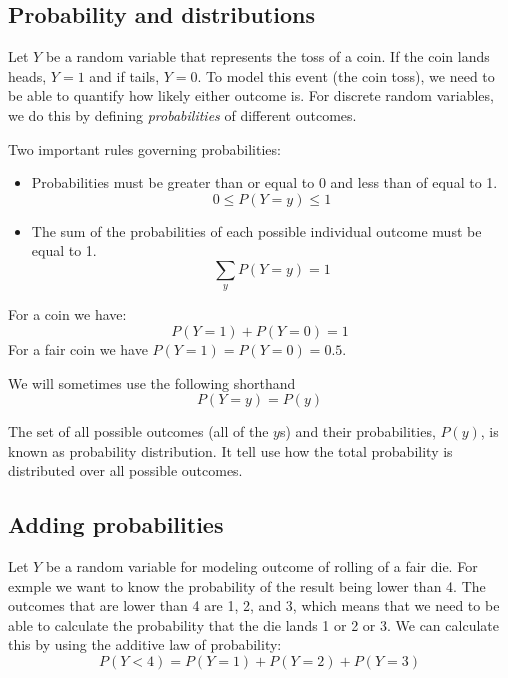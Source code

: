 \documentclass[a4paper,11pt]{article} %
\begin{document}
\subsection{Probability and distributions}

Let $Y$ be a random variable that represents the toss of a coin. If the coin lands heads,
$Y=1$ and if tails, $Y = 0$. To model this event (the coin toss), we need to be able
to quantify how likely either outcome is. For discrete random variables, we do this
by defining \emph{probabilities} of different outcomes.

Two important rules governing probabilities:
\begin{itemize}
%
\item Probabilities must be greater than or equal to 0 and less than of equal to 1.
\begin{equation}
0 \leq P(Y=y) \leq 1
\end{equation}
%
\item The sum of the probabilities of each possible individual outcome must be
equal to 1.
\begin{equation}
\sum_{y} P(Y=y) = 1
\end{equation}
%
\end{itemize}

For a coin we have:
\begin{equation}
P(Y=1) + P(Y=0) = 1
\end{equation}
For a fair coin we have $P(Y=1) = P(Y=0) = 0.5$.

We will sometimes use the following shorthand
\begin{equation}
P(Y=y) = P(y)
\end{equation}

The set of all possible outcomes (all of the $y$s) and their probabilities, $P(y)$,
is known as probability distribution. It tell use how the total probability is
distributed over all possible outcomes.

\subsection{Adding probabilities}

Let $Y$ be a random variable for modeling outcome of rolling of a fair die.
For exmple we want to know the probability of the result being lower than 4.
The outcomes that are lower than 4 are 1, 2, and 3, which means that we need
to be able to calculate the probability that the die lands 1 or 2 or 3.
We can calculate this by using the additive law of probability:
\begin{equation*}
P(Y < 4) = P(Y=1) + P(Y=2) + P(Y=3)
\end{equation*}
\end{document}
